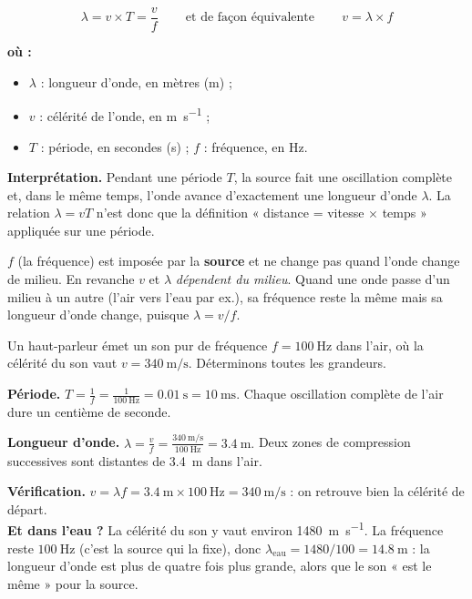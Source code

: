\documentclass[11pt,a4paper]{article}
\newenvironment{ou}{%
  \par\smallskip\noindent\textbf{où :}\nopagebreak
  \begin{itemize}[leftmargin=1.8em,topsep=2pt,itemsep=1.5pt,parsep=0pt]}%
  {\end{itemize}}
\begin{document}
\begin{formule}
\[ \boxed{\,\lambda = v\times T = \dfrac{v}{f}\,}
   \qquad\text{et de façon équivalente}\qquad
   \boxed{\,v = \lambda\times f\,} \]
\begin{ou}
  \item $\lambda$ : longueur d'onde, en mètres (\si{\metre}) ;
  \item $v$ : célérité de l'onde, en \si{\metre\per\second} ;
  \item $T$ : période, en secondes (\si{\second}) ; \quad $f$ : fréquence, en \si{\hertz}.
\end{ou}
\textbf{Interprétation.} Pendant une période $T$, la source fait une oscillation complète et,
dans le même temps, l'onde avance d'exactement une longueur d'onde $\lambda$. La relation
$\lambda = vT$ n'est donc que la définition « distance = vitesse $\times$ temps » appliquée sur
une période.
\end{formule}

\begin{attention}
$f$ (la fréquence) est imposée par la \textbf{source} et ne change pas quand l'onde change de
milieu. En revanche $v$ et $\lambda$ \emph{dépendent du milieu}. Quand une onde passe d'un
milieu à un autre (l'air vers l'eau par ex.), sa fréquence reste la même mais sa longueur
d'onde change, puisque $\lambda = v/f$.
\end{attention}

\begin{exemple}
Un haut-parleur émet un son pur de fréquence $f = \SI{100}{\hertz}$ dans l'air, où la célérité
du son vaut $v = \SI{340}{\metre\per\second}$. Déterminons toutes les grandeurs.

\smallskip
\textbf{Période.} \quad
$\displaystyle T = \frac{1}{f} = \frac{1}{\SI{100}{\hertz}} = \SI{0.01}{\second} = \SI{10}{\milli\second}.$
Chaque oscillation complète de l'air dure un centième de seconde.

\smallskip
\textbf{Longueur d'onde.} \quad
$\displaystyle \lambda = \frac{v}{f} = \frac{\SI{340}{\metre\per\second}}{\SI{100}{\hertz}}
 = \SI{3.4}{\metre}.$
Deux zones de compression successives sont distantes de \SI{3.4}{\metre} dans l'air.

\smallskip
\textbf{Vérification.} \quad
$v = \lambda f = \SI{3.4}{\metre}\times\SI{100}{\hertz} = \SI{340}{\metre\per\second}$ : on
retrouve bien la célérité de départ. \\[2pt]
\textbf{Et dans l'eau ?} La célérité du son y vaut environ \SI{1480}{\metre\per\second}. La
fréquence reste $\SI{100}{\hertz}$ (c'est la source qui la fixe), donc
$\lambda_{\text{eau}} = 1480/100 = \SI{14.8}{\metre}$ : la longueur d'onde est plus de
quatre fois plus grande, alors que le son « est le même » pour la source.
\end{exemple}
\end{document}
